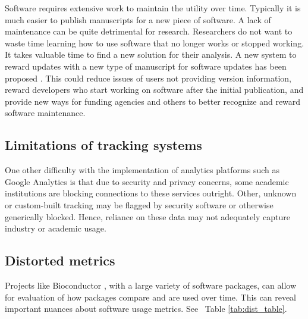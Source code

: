 \documentclass{article}
\begin{document}
Software requires extensive work to maintain the utility over time. Typically it is much easier to publish manuscripts for a new piece of software. A lack of maintenance can be quite detrimental for research. Researchers do not want to waste time learning how to use software that no longer works or stopped working. It takes valuable time 
 to find a new solution for their analysis. A new system to reward updates with a new type of manuscript for software updates has been proposed \cite{merow_better_2023}. This could reduce issues of users not providing version information, reward developers who start working on software after the initial publication, and provide new ways for funding agencies and others to better recognize and reward software maintenance. 

\subsection{Limitations of tracking systems}

One other difficulty with the implementation of analytics platforms such as Google Analytics is that due to security and privacy concerns, some academic institutions are blocking connections to these services outright. Other, unknown or custom-built tracking may be flagged by security software or otherwise generically blocked. Hence, reliance on these data may not adequately capture industry or academic usage.

\subsection{Distorted metrics}

Projects like Bioconductor \cite{bioconductor}, with a large variety of software packages, can allow for evaluation of how packages compare and are used over time. This can reveal important nuances about software usage metrics. See ~Table \ref{tab:dist_table}.
\end{document}
